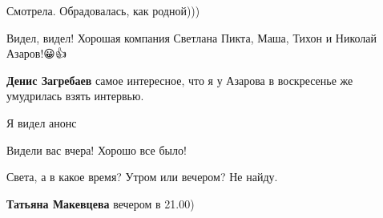 \begin{itemize}
Смотрела. Обрадовалась, как родной)))

 
Видел, видел! Хорошая компания Светлана Пикта, Маша, Тихон и Николай Азаров!😀👍

\begin{itemize}
 
\textbf{Денис Загребаев} самое интересное, что я у Азарова в воскресенье же умудрилась взять интервью.

 
Я видел анонс
\end{itemize}

 
Видели вас вчера!
Хорошо все было!

 
Света, а в какое время? Утром или вечером? Не найду.

\begin{itemize}
 
\textbf{Татьяна Макевцева} вечером в 21.00)


\end{itemize}
\end{itemize}
